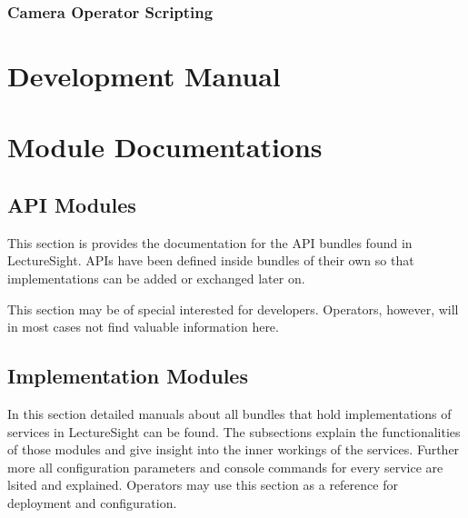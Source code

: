 \documentclass[a4paper,10pt]{book}
\begin{document}
\subsection{Camera Operator Scripting}

\chapter{Development Manual}

\chapter{Module Documentations}

\section{API Modules}

This section is provides the documentation for the API bundles found in LectureSight. APIs have been defined inside bundles of their own so that implementations can be added or exchanged later on.

This section may be of special interested for developers. Operators, however, will in most cases not find valuable information here. 

\section{Implementation Modules}

In this section detailed manuals about all bundles that hold implementations of services in LectureSight can be found. The subsections explain the functionalities of those modules  and give insight into the inner workings of the services. Further more all configuration parameters and console commands for every service are lsited and explained. Operators may use this section as a reference for deployment and configuration.


\backmatter
%
%
 
 
\end{document}
